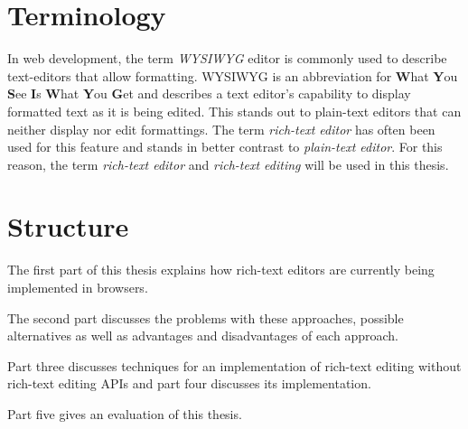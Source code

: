 \section{Terminology}

In web development, the term \textit{WYSIWYG} editor is commonly used to describe text-editors that allow formatting. WYSIWYG is an abbreviation for \textbf{W}hat \textbf{Y}ou \textbf{S}ee \textbf{I}s \textbf{W}hat \textbf{Y}ou \textbf{G}et and describes a text editor's capability to display formatted text as it is being edited. This stands out to plain-text editors that can neither display nor edit formattings. The term \textit{rich-text editor} has often been used for this feature and stands in better contrast to \textit{plain-text editor}. For this reason, the term \textit{rich-text editor} and \textit{rich-text editing} will be used in this thesis.

\section{Structure}

The first part of this thesis explains how rich-text editors are currently being implemented in browsers.

The second part discusses the problems with these approaches, possible alternatives as well as advantages and disadvantages of each approach.

Part three discusses techniques for an implementation of rich-text editing without rich-text editing APIs and part four discusses its implementation.

Part five gives an evaluation of this thesis.
